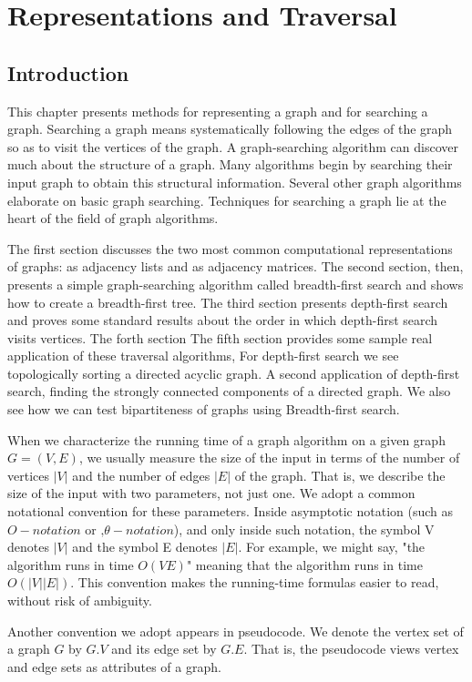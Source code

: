 \documentclass[12pt,a4paper]{book}
\begin{document}
\chapter{Representations and Traversal}
\section{Introduction}
This chapter presents methods for representing a graph and for searching a graph. Searching a graph means systematically following the edges of the graph so as to visit the vertices of the graph. A graph-searching algorithm can discover much about the structure of a graph. Many algorithms begin by searching their input graph to obtain this structural information. Several other graph algorithms elaborate on basic graph searching. Techniques for searching a graph lie at the heart of the field of graph algorithms.\par
The first section discusses the two most common computational representations of graphs: as adjacency lists and as adjacency matrices. The second section, then, presents a simple graph-searching algorithm called breadth-first search and shows how to create a breadth-first tree. The third section presents depth-first search and proves some standard results about the order in which depth-first search visits vertices. The forth section The fifth section provides some sample real application of these traversal algorithms, For depth-first search we see topologically sorting a directed acyclic graph. A second application of depth-first search, finding the strongly connected components of a directed graph. We also see how we can test bipartiteness of graphs using Breadth-first search.\par
When we characterize the running time of a graph algorithm on a given graph $G = (V, E)$, we usually measure the size of the input in terms of the number of vertices $|V|$ and the number of edges $|E|$ of the graph. That is, we describe the size of the input with two parameters, not just one. We adopt a common notational convention for these parameters. Inside asymptotic notation (such as $O-notation$ or ‚$\theta-notation$), and only inside such notation, the symbol V denotes $|V|$ and the symbol E denotes $|E|$. For example, we might say, "the algorithm runs in time $O(VE)$" meaning that the algorithm runs in time $O(|V| |E|)$. This convention makes the running-time formulas easier to read, without risk of ambiguity.\par
Another convention we adopt appears in pseudocode. We denote the vertex set of a graph $G$ by $G.V$ and its edge set by $G.E$. That is, the pseudocode views vertex and edge sets as attributes of a graph.
\end{document}
